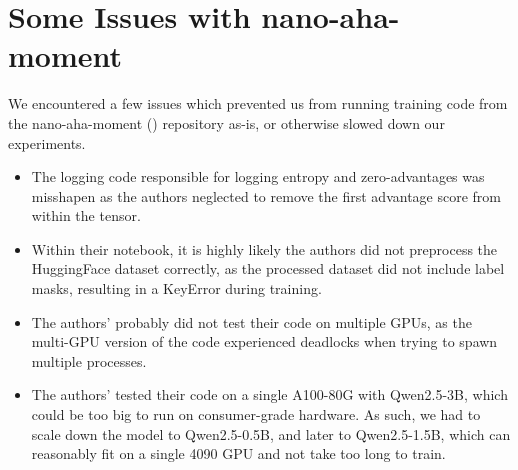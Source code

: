 \documentclass{article} %
\theoremstyle{definition}
\begin{document}


\appendix

\section{Some Issues with nano-aha-moment}
\label{sec:nano-aha-moment-issues}
We encountered a few issues which prevented us from running training code from
the nano-aha-moment (\cite{nano-aha-moment}) repository as-is, or otherwise
slowed down our experiments.
\begin{itemize}
    \item The logging code responsible for logging entropy and zero-advantages
        was misshapen as the authors neglected to remove the first advantage score
        from within the tensor.
    \item Within their notebook, it is highly likely the authors did not preprocess
        the HuggingFace dataset correctly, as the processed dataset did not include
        label masks, resulting in a KeyError during training.
    \item The authors' probably did not test their code on multiple GPUs,
        as the multi-GPU version of the code experienced deadlocks when
        trying to spawn multiple processes.
    \item The authors' tested their code on a single A100-80G with Qwen2.5-3B,
        which could be too big to run on consumer-grade hardware.
        As such, we had to scale down the model to Qwen2.5-0.5B, and later to Qwen2.5-1.5B,
        which can reasonably fit on a single 4090 GPU and not take too long to train.
\end{itemize}
\end{document}

